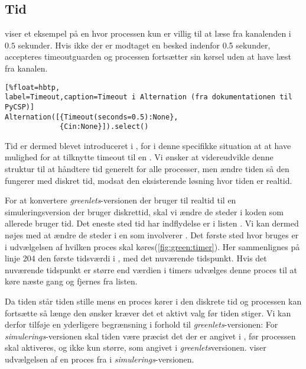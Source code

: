 \subsection{Tid} \label{sec:tid}
 viser et eksempel på en  hvor processen kun er villig
til at læse fra kanalenden  i $0.5$ sekunder. Hvis ikke der
er modtaget en besked indenfor 0.5 sekunder, accepteres timeoutguarden
og processen fortsætter sin kørsel uden at have læst fra kanalen.

\begin{lstlisting}[%float=hbtp, 
label=Timeout,caption=Timeout i Alternation (fra dokumentationen til PyCSP)]
Alternation([{Timeout(seconds=0.5):None}, 
             {Cin:None}]).select()
\end{lstlisting}

Tid er dermed blevet introduceret i \pycsp, for i denne specifikke situation at at have
mulighed for at tilknytte timeout til en . Vi ønsker
at videreudvikle denne struktur til at håndtere tid generelt for alle
processer, men ændre tiden så den fungerer med diskret tid, modsat den eksisterende
løsning hvor tiden er realtid.

For at konvertere \emph{greenlets}-versionen der bruger  til realtid til en simuleringsversion der bruger diskrettid, skal vi ændre de steder i koden som allerede bruger tid. Det eneste sted tid har indflydelse er i listen . Vi kan dermed nøjes med at ændre de steder i \sched en som involverer . Det første sted hvor  bruges er i udvælgelsen af hvilken proces skal køres(\cref{fig:green:timer}). Her sammenlignes på linje 204 den første tidsværdi i , med det nuværende tidspunkt. Hvis det nuværende tidspunkt er større end værdien i timers udvælges denne proces til at køre næste gang og fjernes fra listen.

Da tiden står tiden stille mens en proces kører i den diskrete tid og processen kan fortsætte så længe den ønsker kræver det et aktivt valg før tiden stiger. Vi kan derfor tilføje en yderligere begrænsning i forhold til \emph{greenlets}-versionen: For \emph{simulerings}-versionen skal tiden være præcist det der er angivet i , før processen skal aktiveres, og ikke kun større, som angivet i \emph{greenlets}versionen.  viser udvælgelsen af en proces fra  i \emph{simulerings}-versionen.

